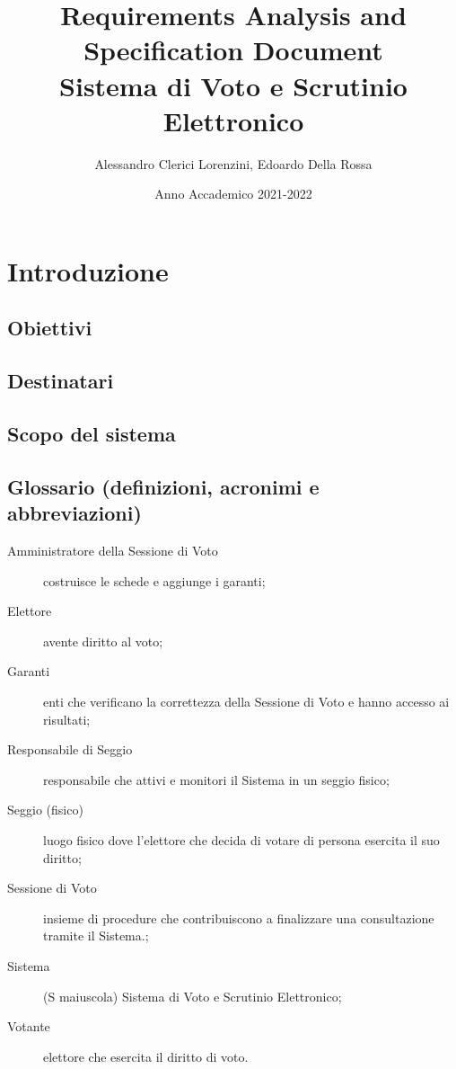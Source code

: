 \documentclass{report}
\begin{document}
\title{Requirements Analysis and Specification Document \\
\large Sistema di Voto e Scrutinio Elettronico}
\author{Alessandro Clerici Lorenzini, Edoardo Della Rossa}
\date{Anno Accademico 2021-2022}
\maketitle

\tableofcontents

\chapter{Introduzione}
\section{Obiettivi}
\section{Destinatari}
\section{Scopo del sistema}
\section{Glossario (definizioni, acronimi e abbreviazioni)}
\begin{description}
	\item[Amministratore della Sessione di Voto] costruisce le schede e aggiunge i garanti;
	\item[Elettore] avente diritto al voto;
	\item[Garanti] enti che verificano la correttezza della Sessione di Voto e hanno accesso ai risultati;
	\item[Responsabile di Seggio] responsabile che attivi e monitori il Sistema in un seggio fisico;
	\item[Seggio (fisico)] luogo fisico dove l'elettore che decida di votare di persona esercita il suo diritto;
	\item[Sessione di Voto] insieme di procedure che contribuiscono a finalizzare una consultazione tramite il Sistema.;
	\item[Sistema] (S maiuscola) Sistema di Voto e Scrutinio Elettronico;
	\item[Votante] elettore che esercita il diritto di voto.
\end{description}
\end{document}
